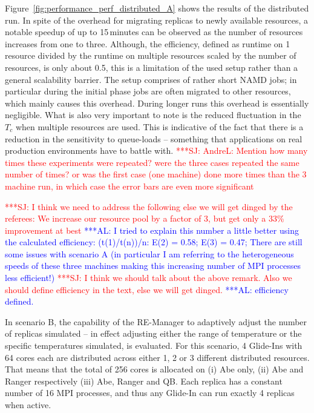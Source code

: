 \documentclass{rspublic}
\newcommand{\alnote}[1]{ {\textcolor{blue} { ***AL: #1 }}}
\newcommand{\jhanote}[1]{ {\textcolor{red} { ***SJ: #1 }}}
\newcommand{\alnote}[1]{}
\newcommand{\jhanote}[1]{}
\begin{document}
Figure~\ref{fig:performance_perf_distributed_A} shows the results of
the distributed run. In spite of the overhead for migrating replicas
to newly available resources, a notable speedup of up to 15\,minutes
can be observed as the number of resources increases from one to
three. Although, the efficiency, defined as runtime on 1 resource
divided by the runtime on multiple resources scaled by the number of
resources, is only about 0.5, this is a limitation of the used setup
rather than a general scalability barrier.  The setup comprises of
rather short NAMD jobs; in particular during the initial phase jobs
are often migrated to other resources, which mainly causes this
overhead. During longer runs this overhead is essentially
negligible. What is also very important to note is the reduced
fluctuation in the $T_c$ when multiple resources are used. This is
indicative of the fact that there is a reduction in the sensitivity to
queue-loads -- something that applications on real production
environments have to battle with.  \jhanote{AndreL: Mention how many
  times these experiments were repeated? were the three cases repeated
  the same number of times? or was the first case (one machine) done
  more times than the 3 machine run, in which case the error bars are
  even more significant}

\jhanote{I think we need to address
  the following else we will get dinged by the referees: We increase
  our resource pool by a factor of 3, but get only a 33\% improvement
  at best} \alnote{I tried to explain this number a little better
  using the calculated efficiency: (t(1)/t(n))/n: E(2) = 0.58; E(3) =
  0.47; There are still some issues with scenario A (in particular I
  am referring to the heterogeneous speeds of these three machines
  making this increasing number of MPI processes less efficient!)}
\jhanote{I think we should talk about the above remark. Also we should
  define efficiency in the text, else we will get dinged.}  
\alnote{efficiency defined.}

In scenario B, the capability of the RE-Manager to adaptively adjust
the number of replicas simulated -- in effect adjusting either the
range of temperature or the specific temperatures simulated, is
evaluated.  For this scenario, 4 Glide-Ins with 64 cores each
are distributed across either 1, 2 or 3 different distributed
resources. That means that the total of 256 cores is allocated on (i)
Abe only, (ii) Abe and Ranger respectively (iii) Abe, Ranger and QB.
Each replica has a constant number of 16 MPI processes, and thus any
Glide-In can run exactly 4 replicas when active.
\end{document}
